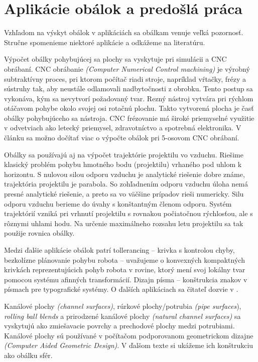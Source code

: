 \section{Aplikácie obálok a predošlá práca}
Vzhľadom na výskyt obálok v aplikáciách sa obálkam venuje veľká pozornosť. Stručne spomenieme niektoré aplikácie a odkážeme na literatúru. 

Výpočet obálky pohybujúcej sa plochy sa vyskytuje pri simulácii a CNC obrábaní. CNC obrábanie \textit{(Computer Numerical Control machining)}  je výrobný subtraktívny proces, pri ktorom počítač riadi stroje, napríklad vŕtačky, frézy a sústruhy tak, aby neustále odlamovali nadbytočnosti z obrobku. Tento postup sa vykonáva, kým sa nevytvorí požadovaný tvar. Rezný nástroj vytvára pri rýchlom otáčavom pohybe okolo svojej osi rotačnú plochu. Takto vytvorená plocha je časť obálky pohybujúceho sa nástroja. CNC frézovanie má široké priemyselné využitie v odvetviach ako letecký priemysel, zdravotníctvo a spotrebná elektronika. V článku \cite{Skop20} sa možno dočítať viac o výpočte obálok pri 5-osovom CNC obrábaní.  

Obálky sa používajú aj na výpočet trajektórie projektilu vo vzduchu. Riešime klasický problém pohybu hmotného bodu (projektilu) vrhaného pod uhlom k horizontu. S nulovou silou odporu vzduchu je analytické riešenie dobre známe, trajektória projektilu je parabola. So zohľadnením odporu vzduchu úloha nemá presné analytické riešenie, a preto sa vo väčšine prípadov rieši numericky. Silu odporu vzduchu berieme do úvahy s konštantným členom odporu. Systém trajektórií vzniká pri vrhnutí projektilu s rovnakou počiatočnou rýchlosťou, ale s rôznymi uhlami hodu. Na určenie maximálneho rozsahu letu projektilu sa tak použije rovnica obálky. \cite{Chud09}

Medzi ďalšie aplikácie obálok patrí tollerancing – krivka s kontrolou chyby, bezkolízne plánovanie pohybu robota – uvažujeme o konvexných kompaktných krivkách reprezentujúcich pohyb robota v rovine, ktorý mení svoj lokálny tvar pomocou systému afinných transformácií. Dizajn písma – konštrukcia znakov v písmach pre typografické systémy. O ďalších aplikáciach sa čitateľ dozvie v \cite{Pott09}.

Kanálové plochy \textit{(channel surfaces)}, rúrkové plochy/potrubia \textit{(pipe surfaces}), \textit{rolling ball blends} a prirodzené kanálové plochy \textit{(natural channel surfaces)} sa vyskytujú ako zmiešavacie povrchy a prechodové plochy medzi potrubiami. Kanálové plochy sú používané v počítačom podporovanom geometrickom dizajne \textit{(Computer Aided Geometric Design)}. V ďalšom texte si ukážeme ich konštrukciu ako obálku sfér.

